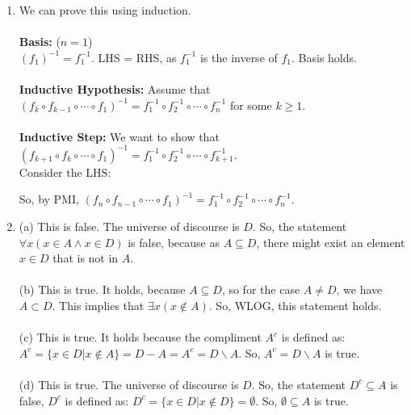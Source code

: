 \documentclass[a4paper]{article}
\begin{document}
\begin{enumerate}
\item We can prove this using induction. \\
\\
\textbf{Basis:} ($n=1$)\\
    $(f_1)^{-1}=f_1^{-1}$.
    LHS = RHS, as $f_1^{-1}$ is the inverse of $f_1$. Basis holds.\\
    \\
\textbf{Inductive Hypothesis:} Assume that $(f_k \circ f_{k-1} \circ \cdots \circ f_1)^{-1} = f_1^{-1} \circ f_2^{-1} \circ \cdots \circ f_n^{-1}$ for some $k \geq 1$.\\
\\
\textbf{Inductive Step:} We want to show that $(f_{k+1} \circ f_k \circ \cdots \circ f_1)^{-1} = f_1^{-1} \circ f_2^{-1} \circ \cdots \circ f_{k+1}^{-1}$.\\
Consider the LHS:

So, by PMI, $(f_n \circ f_{n-1} \circ \cdots \circ f_1)^{-1} = f_1^{-1} \circ f_2^{-1} \circ \cdots \circ f_n^{-1}$.\\

\item (a) This is false. The universe of discourse is $D$. So, the statement $\forall x (x \in A \land x \in D)$ is false, because as $A \subseteq D$, there might exist an element $x \in D$ that is not in $A$.\\
\\
(b) This is true. It holds, because $A \subseteq D$, so for the case $A \neq D$, we have $A \subset D$. This implies that $\exists x (x \notin A)$. So, WLOG, this statement holds.\\
\\
(c) This is true. It holds because the compliment $A^c$ is defined as: $A^c = \{x \in D | x \notin A\} = D - A = A^c = D \backslash A$. So, $A^c = D \backslash A$ is true.\\
\\
(d) This is true. The universe of discourse is $D$. So, the statement $D^c \subseteq A$ is false, $D^c$ is defined as: $D^c = \{x \in D | x \notin D\} = \emptyset$. So, $\emptyset \subseteq A$ is true.\\


\end{enumerate}
\end{document}
